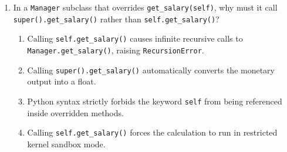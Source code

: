 \documentclass[11pt,a4paper]{article}
\begin{document}
\begin{enumerate}[label=\textbf{Q\arabic*.},leftmargin=2em,itemsep=1.5pt,topsep=1pt]
\begin{enumerate}[label=\Alph*.,leftmargin=2em]
\item The subclass method overrides (replaces) the superclass implementation for instances of the subclass.
\item A \texttt{NameError} is raised at runtime due to duplicate method declarations in the hierarchy.
\item The Python runtime executes both the superclass method and subclass method concurrently in threads.
\item The superclass method is permanently erased from memory for instances of all classes.
\end{enumerate}
\item In a \texttt{Manager} subclass that overrides \texttt{get\_salary(self)}, why must it call \texttt{super().get\_salary()} rather than \texttt{self.get\_salary()}?
\begin{enumerate}[label=\Alph*.,leftmargin=2em]
\item Calling \texttt{self.get\_salary()} causes infinite recursive calls to \texttt{Manager.get\_salary()}, raising \texttt{RecursionError}.
\item Calling \texttt{super().get\_salary()} automatically converts the monetary output into a float.
\item Python syntax strictly forbids the keyword \texttt{self} from being referenced inside overridden methods.
\item Calling \texttt{self.get\_salary()} forces the calculation to run in restricted kernel sandbox mode.
\end{enumerate}
\end{enumerate}
\newpage
\end{document}
